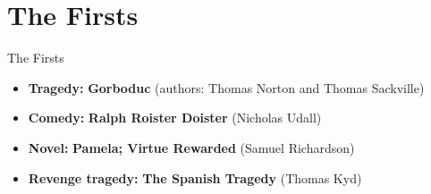 \documentclass[
  12pt,
    progressbar=frametitle]{beamer}
\providecommand{\tightlist}{%
  \setlength{\itemsep}{0pt}\setlength{\parskip}{0pt}}
\begin{document}


\section{The Firsts}
\begin{frame}[allowframebreaks]
{The Firsts}
\begin{itemize}
\tightlist
\item
  \textbf{Tragedy:} \textbf{Gorboduc} (authors: Thomas Norton and Thomas
  Sackville)
\item
  \textbf{Comedy:} \textbf{Ralph Roister Doister} (Nicholas Udall)
\item
  \textbf{Novel:} \textbf{Pamela; Virtue Rewarded} (Samuel Richardson)
\item
  \textbf{Revenge tragedy:} \textbf{The Spanish Tragedy} (Thomas Kyd)
\end{itemize}
\end{frame}
\end{document}
